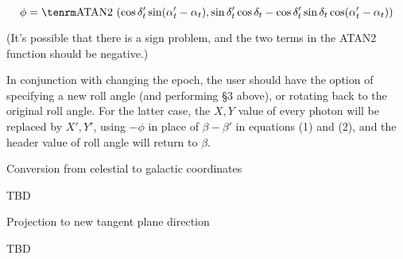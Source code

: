 $$\phi = {\rm ATAN2}~(\cos \delta_t' \sin (\alpha_t' - \alpha_t),
\sin \delta_t' \cos \delta_t -
\cos \delta_t' \sin \delta_t  \cos (\alpha_t' - \alpha_t))$$

(It's possible that there is a sign problem, and the two terms in the
ATAN2 function should be negative.) 

In conjunction with changing the epoch, the user should have the
option of specifying a new roll angle (and performing \S 3 above), or
rotating back to the original roll angle.  For the latter case, the
$X,Y$ value of
every photon will be replaced by $X',Y'$, using $-\phi$ in place of
$\beta - \beta'$ in equations (1) and (2), and the header value of
roll angle will return to $\beta$.  

\@{Conversion from celestial to galactic coordinates}

TBD

\@{Projection to new tangent plane direction}

TBD

\vfill\eject






